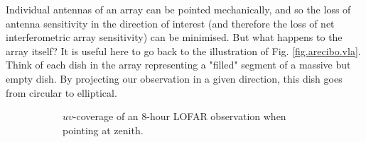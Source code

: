 \pg
Individual antennas of an array can be pointed mechanically, and so the loss of antenna sensitivity in the direction of interest (and therefore the loss of net interferometric array sensitivity) can be minimised. But what happens to the array itself? It is useful here to go back to the illustration of Fig. \ref{fig.arecibo.vla}. Think of each dish in the array representing a "filled" segment of a massive but empty dish. By projecting our observation in a given direction, this dish goes from circular to elliptical.
\begin{figure}[ht]
\centering
\begin{subfigure}{.40\textwidth}
\caption{\label{fig.lofar.uvcoverage.zenith} $uv$-coverage of an 8-hour LOFAR observation when pointing at zenith.}
\end{subfigure}
\hfill
\begin{subfigure}{.40\textwidth}

\end{subfigure}
\end{figure}
